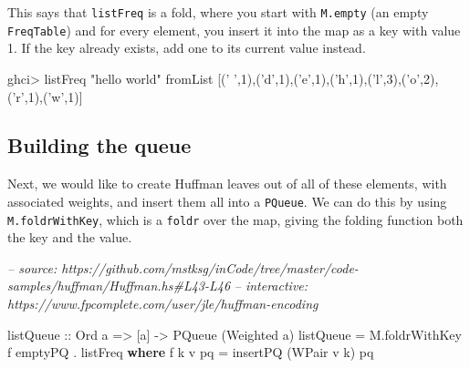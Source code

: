\documentclass[]{article}
\newenvironment{Shaded}{}{}
\newcommand{\CharTok}[1]{\textcolor[rgb]{0.25,0.44,0.63}{#1}}
\newcommand{\CommentTok}[1]{\textcolor[rgb]{0.38,0.63,0.69}{\textit{#1}}}
\newcommand{\DataTypeTok}[1]{\textcolor[rgb]{0.56,0.13,0.00}{#1}}
\newcommand{\DecValTok}[1]{\textcolor[rgb]{0.25,0.63,0.44}{#1}}
\newcommand{\FunctionTok}[1]{\textcolor[rgb]{0.02,0.16,0.49}{#1}}
\newcommand{\KeywordTok}[1]{\textcolor[rgb]{0.00,0.44,0.13}{\textbf{#1}}}
\newcommand{\NormalTok}[1]{#1}
\newcommand{\OtherTok}[1]{\textcolor[rgb]{0.00,0.44,0.13}{#1}}
\newcommand{\StringTok}[1]{\textcolor[rgb]{0.25,0.44,0.63}{#1}}
\begin{document}
This says that \texttt{listFreq} is a fold, where you start with
\texttt{M.empty} (an empty \texttt{FreqTable}) and for every element, you insert
it into the map as a key with value 1. If the key already exists, add one to its
current value instead.

\begin{Shaded}
\begin{Highlighting}[]
\NormalTok{ghci}\FunctionTok{>}\NormalTok{ listFreq }\StringTok{"hello world"}
\NormalTok{fromList [(}\CharTok{' '}\NormalTok{,}\DecValTok{1}\NormalTok{),(}\CharTok{'d'}\NormalTok{,}\DecValTok{1}\NormalTok{),(}\CharTok{'e'}\NormalTok{,}\DecValTok{1}\NormalTok{),(}\CharTok{'h'}\NormalTok{,}\DecValTok{1}\NormalTok{),(}\CharTok{'l'}\NormalTok{,}\DecValTok{3}\NormalTok{),(}\CharTok{'o'}\NormalTok{,}\DecValTok{2}\NormalTok{),(}\CharTok{'r'}\NormalTok{,}\DecValTok{1}\NormalTok{),(}\CharTok{'w'}\NormalTok{,}\DecValTok{1}\NormalTok{)]}
\end{Highlighting}
\end{Shaded}

\hypertarget{building-the-queue}{%
\subsection{Building the queue}\label{building-the-queue}}

Next, we would like to create Huffman leaves out of all of these elements, with
associated weights, and insert them all into a \texttt{PQueue}. We can do this
by using \texttt{M.foldrWithKey}, which is a \texttt{foldr} over the map, giving
the folding function both the key and the value.

\begin{Shaded}
\begin{Highlighting}[]
\CommentTok{-- source: https://github.com/mstksg/inCode/tree/master/code-samples/huffman/Huffman.hs#L43-L46}
\CommentTok{-- interactive: https://www.fpcomplete.com/user/jle/huffman-encoding}

\OtherTok{listQueue ::} \DataTypeTok{Ord}\NormalTok{ a }\OtherTok{=>}\NormalTok{ [a] }\OtherTok{->} \DataTypeTok{PQueue}\NormalTok{ (}\DataTypeTok{Weighted}\NormalTok{ a)}
\NormalTok{listQueue }\FunctionTok{=}\NormalTok{ M.foldrWithKey f emptyPQ }\FunctionTok{.}\NormalTok{ listFreq}
  \KeywordTok{where}
\NormalTok{    f k v pq }\FunctionTok{=}\NormalTok{ insertPQ (}\DataTypeTok{WPair}\NormalTok{ v k) pq}
\end{Highlighting}
\end{Shaded}
\end{document}
